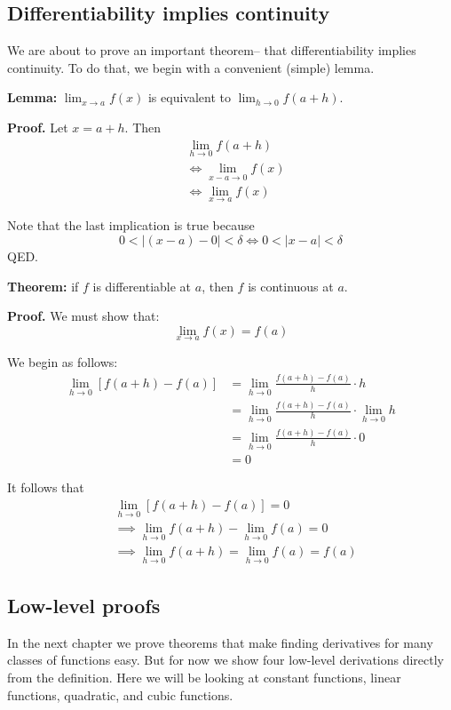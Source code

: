 \subsection{Differentiability implies continuity}\label{diff-implies-cont}

We are about to prove an important theorem-- that differentiability
implies continuity. To do that, we begin with a convenient (simple)
lemma.

\vs

\textbf{Lemma:} $\lim_{x\to a}f(x)$ is equivalent to $\lim_{h\to
  0}f(a+h)$.

\textbf{Proof.} Let $x=a+h$. Then
\begin{align*}
  &\lim_{h\to0}f(a+h)\\
  &\iff\lim_{x-a\to0}f(x)\\
  &\iff\lim_{x\to a}f(x)
\end{align*}

Note that the last implication is true because
\[0<|(x-a)-0|<\delta\iff 0<|x-a|<\delta\]
QED.

\vs

\textbf{Theorem:} if $f$ is differentiable at $a$, then $f$ is
continuous at $a$.

\textbf{Proof.} We must show that:
\[\lim_{x\to a}f(x)=f(a)\]

We begin as follows:
\begin{align*}
  \lim_{h\to0}[f(a+h)-f(a)]&=\lim_{h\to0}\frac{f(a+h)-f(a)}{h}\cdot h\\
                         &=\lim_{h\to0}\frac{f(a+h)-f(a)}{h}\cdot \lim_{h\to
                           0}h\\
                         &=\lim_{h\to0}\frac{f(a+h)-f(a)}{h}\cdot 0\\
                         &=0
\end{align*}

It follows that
\begin{align*}
  &\lim_{h\to0}[f(a+h)-f(a)]=0\\
  &\implies \lim_{h\to0}f(a+h)-\lim_{h\to0}f(a)=0\\
  &\implies \lim_{h\to0}f(a+h)=\lim_{h\to0}f(a)=f(a)
\end{align*}

\subsection{Low-level proofs}

In the next chapter we prove theorems that make finding derivatives
for many classes of functions easy. But for now we show four low-level
derivations directly from the definition. Here we will be looking at
constant functions, linear functions, quadratic, and cubic functions.

